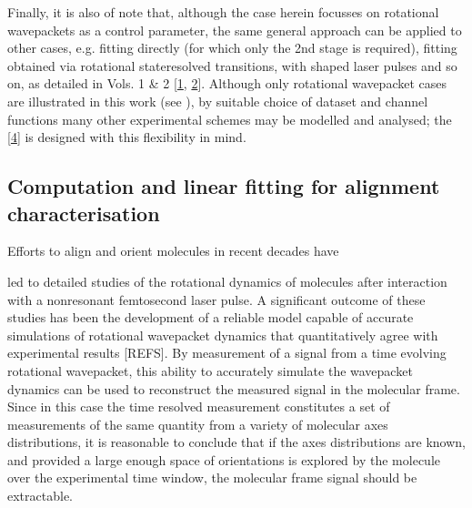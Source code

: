 \documentclass[letterpaper,table,10pt,english]{jupyterBook}
\begin{document}
\sphinxAtStartPar
Finally, it is also of note that, although the case herein focusses on rotational wavepackets as a control parameter, the same general approach can be applied to other cases, e.g. fitting {\hyperref[\detokenize{backmatter/glossary:term-MF}]{}} {\hyperref[\detokenize{backmatter/glossary:term-PADs}]{}} directly (for which only the 2nd stage is required), fitting {\hyperref[\detokenize{backmatter/glossary:term-PADs}]{}} obtained via rotational state\sphinxhyphen{}resolved transitions, with shaped laser pulses and so on, as detailed in  Vols. 1 \& 2 {[}\hyperlink{cite.backmatter/bibliography:id613}{1}, \hyperlink{cite.backmatter/bibliography:id614}{2}{]}. Although only rotational wavepacket cases are illustrated in this work (see ), by suitable choice of dataset and channel functions many other experimental schemes may be modelled and analysed; the  {[}\hyperlink{cite.backmatter/bibliography:id618}{4}{]} is designed with  this flexibility in mind.


\subsection{Computation and linear fitting for alignment characterisation}
\label{\detokenize{part1/numerics_231122:computation-and-linear-fitting-for-alignment-characterisation}}
\sphinxAtStartPar
Efforts to align and orient molecules in recent decades have

\sphinxAtStartPar
led to detailed studies of the rotational dynamics of molecules after interaction with a non\sphinxhyphen{}resonant femtosecond laser pulse. A significant outcome of these studies has been the development of a reliable model capable of accurate simulations of rotational wavepacket dynamics that quantitatively agree with experimental results {[}REFS{]}. By measurement of a signal from a time evolving rotational wavepacket, this ability to accurately simulate the wavepacket dynamics can be used to reconstruct the measured signal in the molecular frame. Since in this case the time resolved measurement constitutes a set of measurements of the same quantity from a variety of molecular axes distributions, it is reasonable to conclude that if the axes distributions are known, and provided a large enough space of orientations is explored by the molecule over the experimental time window, the molecular frame signal should be extractable.
\end{document}
